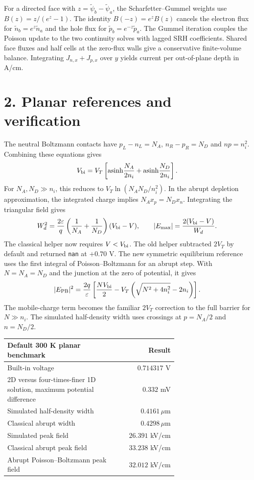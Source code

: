 \documentclass[11pt,a4paper]{article}
\newcommand{\um}{\,\mu\mathrm{m}}
\begin{document}
For a directed face with \(z=\tilde\psi_b-\tilde\psi_a\),
the Scharfetter--Gummel weights use \(B(z)=z/(e^z-1)\).
The identity \(B(-z)=e^z B(z)\) cancels the electron flux for
\(\tilde n_b=e^z\tilde n_a\) and the hole flux for
\(\tilde p_b=e^{-z}\tilde p_a\). The Gummel iteration couples the
Poisson update to the two continuity solves with lagged SRH coefficients.
Shared face fluxes and half cells at the zero-flux walls give a
conservative finite-volume balance. Integrating \(J_{n,x}+J_{p,x}\)
over \(y\) yields current per out-of-plane depth in A/cm.

\newpage
\section*{2. Planar references and verification}
The neutral Boltzmann contacts have \(p_L-n_L=N_A\),
\(n_R-p_R=N_D\) and \(np=n_i^2\). Combining these equations gives
\[
V_{\rm bi}=V_T\left[
\operatorname{asinh}\!\frac{N_A}{2n_i}+
\operatorname{asinh}\!\frac{N_D}{2n_i}\right].
\]
For \(N_A,N_D\gg n_i\), this reduces to \(V_T\ln(N_A N_D/n_i^2)\).
In the abrupt depletion approximation, the integrated charge implies
\(N_Ax_p=N_Dx_n\). Integrating the triangular field gives
\[
W_d^2=\frac{2\varepsilon}{q}\left(\frac1{N_A}+\frac1{N_D}\right)(V_{\rm bi}-V),
\qquad
\lvert E_{\max}\rvert=\frac{2(V_{\rm bi}-V)}{W_d}.
\]
The classical helper now requires \(V<V_{\rm bi}\). The old helper
subtracted \(2V_T\) by default and returned \texttt{nan} at \(+0.70\) V.
The new symmetric equilibrium reference uses the first integral of
Poisson--Boltzmann for an abrupt step. With \(N=N_A=N_D\) and
the junction at the zero of potential, it gives
\[
\lvert E_{\rm PB}\rvert^2
=\frac{2q}{\varepsilon}
\left[\frac{NV_{\rm bi}}{2}
-V_T\left(\sqrt{N^2+4n_i^2}-2n_i\right)\right].
\]
The mobile-charge term becomes the familiar \(2V_T\) correction to
the full barrier for \(N\gg n_i\). The simulated half-density width
uses crossings at \(p=N_A/2\) and \(n=N_D/2\).

\medskip
\begin{tabular}{@{}p{0.69\linewidth}r@{}}
\toprule
\textbf{Default 300 K planar benchmark} & \textbf{Result}\\
\midrule
Built-in voltage & \(0.714317\) V\\
2D versus four-times-finer 1D solution, maximum potential difference & \(0.332\) mV\\
Simulated half-density width & \(0.4161\um\)\\
Classical abrupt width & \(0.4298\um\)\\
Simulated peak field & \(26.391\) kV/cm\\
Classical abrupt peak field & \(33.238\) kV/cm\\
Abrupt Poisson--Boltzmann peak field & \(32.012\) kV/cm\\
\bottomrule
\end{tabular}
\end{document}
